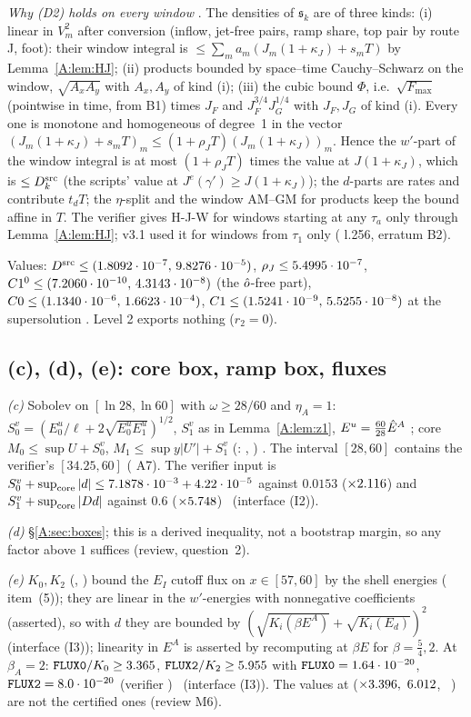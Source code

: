 \documentclass[11pt]{article}
\begin{document}
\noindent\emph{Why (D2) holds on every window} \tP. The densities of $\mathfrak s_k$ are of three kinds: (i) linear in $V_m^2$ after conversion (inflow, jet-free pairs, ramp share, top pair by route J, foot): their window integral is $\le\sum_ma_m(J_m(1+\kappa_J)+s_mT)$ by Lemma~\ref{A:lem:HJ}; (ii) products bounded by space--time Cauchy--Schwarz on the window, $\sqrt{A_xA_y}$ with $A_x,A_y$ of kind (i); (iii) the cubic bound $\Phi$, i.e.\ $\sqrt{F_{\max}}$ (pointwise in time, from B1) times $J_F$ and $J_F^{3/4}J_G^{1/4}$ with $J_F,J_G$ of kind (i). Every one is monotone and homogeneous of degree~1 in the vector $(J_m(1+\kappa_J)+s_mT)_m\le(1+\rho_JT)(J_m(1+\kappa_J))_m$. Hence the $w'$-part of the window integral is at most $(1+\rho_JT)$ times the value at $J(1+\kappa_J)$, which is $\le D^{\rm src}_k$ (the scripts' value at $J^e(\gamma')\ge J(1+\kappa_J)$); the $d$-parts are rates and contribute $t_dT$; the $\eta$-split and the window AM--GM for products keep the bound affine in $T$. The verifier gives H-J-W for windows starting at any $\tau_a$ only through Lemma~\ref{A:lem:HJ}; v3.1 used it for windows from $\tau_1$ only ( l.256, erratum B2).

\noindent Values: $D^{\rm src}\le(1.8092\cdot10^{-7},\,9.8276\cdot10^{-5})$, $\rho_J\le5.4995\cdot10^{-7}$, $C1^0\le(7.2060\cdot10^{-10},\,4.3143\cdot10^{-8})$ (the $\hat o$-free part), $C0\le(1.1340\cdot10^{-6},\,1.6623\cdot10^{-4})$, $C1\le(1.5241\cdot10^{-9},\,5.5255\cdot10^{-8})$ at the supersolution \tC\tB. Level 2 exports nothing ($r_2=0$).

\subsection{(c), (d), (e): core box, ramp box, fluxes}
\emph{(c)} Sobolev on $[\ln28,\ln60]$ with $\omega\ge28/60$ and $\eta_A=1$: $S^v_0=(E^u_0/\ell+2\sqrt{E^u_0E^u_1})^{1/2}$, $S^v_1$ as in Lemma~\ref{A:lem:z1}, $E^u=\frac{60}{28}\hat E^A$ \tP; core $M_0\le\sup U+S^v_0$, $M_1\le\sup y|U'|+S^v_1$ (: , ) \tC. The interval $[28,60]$ contains the verifier's $[34.25,60]$ ( A7). The verifier input is $S^v_0+\sup_{\rm core}|d|\le7.1878\cdot10^{-3}+4.22\cdot10^{-5}$ against $0.0153$ ($\times2.116$) and $S^v_1+\sup_{\rm core}|Dd|$ against $0.6$ ($\times5.748$) \tC\tB\ (interface (I2)).

\emph{(d)} \S\ref{A:sec:boxes}; this is a derived inequality, not a bootstrap margin, so any factor above $1$ suffices (review, question~2).

\emph{(e)} $K_0,K_2$ (, ) bound the $E_I$ cutoff flux on $x\in[57,60]$ by the shell energies ( item~(5)); they are linear in the $w'$-energies with nonnegative coefficients (asserted), so with $d$ they are bounded by $(\sqrt{K_i(\beta E^A)}+\sqrt{K_i(E_d)})^2$ (interface (I3)); linearity in $E^A$ is asserted by recomputing at $\beta E$ for $\beta=\frac54,2$. At $\beta_A=2$: $\fn{FLUX0}/K_0\ge\MarFluxZeroV$, $\fn{FLUX2}/K_2\ge\MarFluxTwoV$ with $\fn{FLUX0}=1.64\cdot10^{-20}$, $\fn{FLUX2}=8.0\cdot10^{-20}$ (verifier ) \tC\tB\ (interface (I3)). The values at  ($\times3.396,\ 6.012$, \SA\ ) are not the certified ones (review M6).
\end{document}
